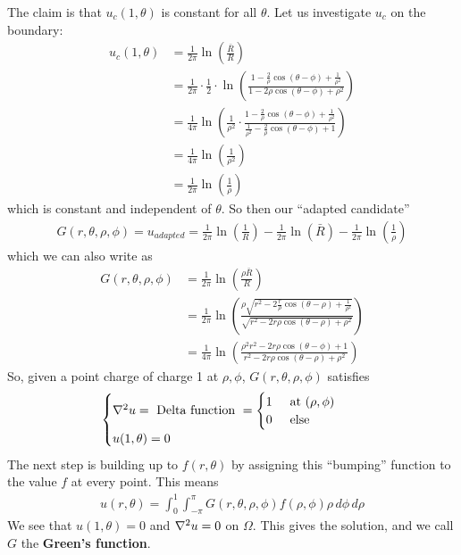 \documentclass{book}
\theoremstyle{definition}
\newcommand{\f}[2]{\frac{#1}{#2}}
\newcommand{\lp}{\left(}
\newcommand{\rp}{\right)}
\begin{document}
The claim is that $u_c(1,\theta)$ is constant for all $\theta$. Let us investigate $u_c$ on the boundary:
\begin{align*}
u_c(1,\theta) &= \f{1}{2\pi}\ln\lp \f{\bar{R}}{R} \rp \\
&= \f{1}{2\pi}\cdot \f{1}{2} \cdot\ln \lp \f{1 - \f{2}{\rho}\cos(\theta-\phi) + \f{1}{\rho^2}}{1 - 2\rho\cos(\theta-\phi) + \rho^2} \rp\\
&= \f{1}{4\pi}\ln\lp \f{1}{\rho^2} \cdot \f{1 - \f{2}{\rho}\cos(\theta-\phi) + \f{1}{\rho^2}}{\f{1}{\rho^2} - \f{2}{\rho}\cos(\theta-\phi) + 1} \rp\\
&= \f{1}{4\pi}\ln\lp \f{1}{\rho^2} \rp\\
&= \f{1}{2\pi}\ln\lp\f{1}{\rho}\rp
\end{align*}
which is constant and independent of $\theta$. So then our ``adapted candidate'' 
\begin{align*}
G(r,\theta,\rho,\phi) = u_{adapted} = \f{1}{2\pi}\ln\lp \f{1}{R} \rp - \f{1}{2\pi}\ln(\bar{R}) - \f{1}{2\pi}\ln\lp \f{1}{\rho} \rp
\end{align*}
which we can also write as
\begin{align*}
G(r,\theta,\rho,\phi) &= \f{1}{2\pi}\ln\lp \f{\rho\bar{R}}{R} \rp \\
&= \f{1}{2\pi}\ln\lp \f{\rho \sqrt{r^2 - 2\f{r}{\rho}\cos(\theta-\rho) + \f{1}{\rho^2}}}{\sqrt{r^2 - 2r\rho\cos(\theta-\rho) + \rho^2}} \rp\\
&= \boxed{\f{1}{4\pi}\ln \lp \f{\rho^2r^2 - 2r\rho\cos(\theta-\phi) + 1}{r^2 - 2r\rho\cos(\theta-\rho) + \rho^2} \rp}
\end{align*}
So, given a point charge of charge 1 at $\rho,\phi$, $G(r,\theta,\rho,\phi)$ satisfies
\begin{align*}
\begin{cases}
\laplacian u = \text{ Delta function } = \begin{cases}
1 \hspace{0.5cm} \text{at $(\rho,\phi)$}\\
0 \hspace{0.5cm} \text{else}
\end{cases}\\
u(1,\theta) = 0
\end{cases}
\end{align*}
The next step is building up to $f(r,\theta)$ by assigning this ``bumping'' function to the value $f$ at every point. This means
\begin{align*}
\boxed{u(r,\theta) = \int^1_0 \int^\pi_{-\pi} G(r,\theta,\rho,\phi)f(\rho,\phi)\rho\,d\phi\,d\rho}
\end{align*}
We see that $u(1,\theta) = 0$ and $\laplacian u = 0$ on $\Omega$. This gives the solution, and we call $G$ the \textbf{Green's function}.
\end{document}
